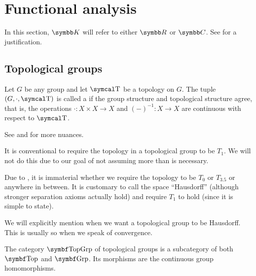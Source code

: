 \section{Functional analysis}\label{sec:functional_analysis}

In this section, \( \BK \) will refer to either \( \BR \) or \( \BC \). See  for a justification.

\subsection{Topological groups}\label{subsec:topological_groups}

\begin{definition}\label{def:topological_group}
  Let \( G \) be any group and let \( \CT \) be a topology on \( G \). The tuple \( (G, \cdot, \CT) \) is called a  if the group structure and topological structure agree, that is, the operations \( \cdot: X \times X \to X \) and \( (-)^{-1}: X \to X \) are continuous with respect to \( \CT \).

  See  and  for more nuances.
\end{definition}

\begin{remark}\label{remark:hausdorff_topological_groups}
  It is conventional to require the topology in a topological group to be \( T_1 \). We will not do this due to our goal of not assuming more than is necessary.

  Due to , it is immaterial whether we require the topology to be \( T_0 \) or \( T_{3.5} \) or anywhere in between. It is customary to call the space \enquote{Hausdorff} (although stronger separation axioms actually hold) and require \( T_1 \) to hold (since it is simple to state).

  We will explicitly mention when we want a topological group to be Hausdorff. This is usually so when we speak of convergence.
\end{remark}

\begin{definition}\label{def:category_of_topological_groups}
  The category \( \Cat{TopGrp} \) of topological groups is a subcategory of both \( \Cat{Top} \) and \( \Cat{Grp} \). Its morphisms are the continuous group homomorphisms.
\end{definition}

